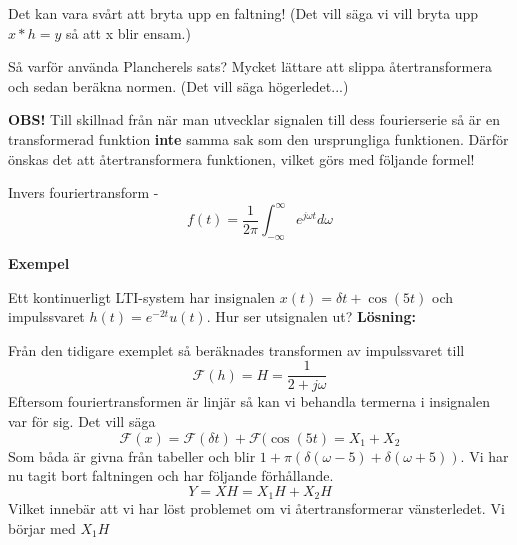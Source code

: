 \documentclass{article}
\begin{document}
Det kan vara svårt att bryta upp en faltning!
(Det vill säga vi vill bryta upp $x*h=y$ så att x blir ensam.)

Så varför använda Plancherels sats? Mycket lättare att slippa återtransformera
och sedan beräkna normen. (Det vill säga högerledet...)

\textbf{OBS!} Till skillnad från när man utvecklar signalen till dess
fourierserie så är en transformerad funktion \textbf{inte} samma sak
som den ursprungliga funktionen.
Därför önskas det att återtransformera funktionen, vilket görs med följande formel!

Invers fouriertransform -
\begin{displaymath}
  f(t) = \frac{1}{2 \pi} \int_{-\infty}^{\infty}  e^{j \omega t} d\omega
\end{displaymath}

\textbf{Exempel} %

Ett kontinuerligt LTI-system har insignalen $x(t)=\delta{t} + \cos(5 t)$
och impulssvaret $h(t) = e^{-2 t} u(t)$. Hur ser utsignalen ut?
\textbf{Lösning:}

Från den tidigare exemplet så beräknades transformen av impulssvaret till
\begin{displaymath}
  \mathcal{F}(h) = H = \frac{1}{2+j \omega}
\end{displaymath}
Eftersom fouriertransformen är linjär så kan vi behandla termerna i
insignalen var för sig. Det vill säga
\begin{displaymath}
  \mathcal{F} (x) = \mathcal{F}(\delta{t}) + \mathcal{F}(\cos(5 t) = X_1 + X_2
\end{displaymath}
Som båda är givna från tabeller och blir
$1+\pi(\delta(\omega - 5) + \delta(\omega + 5))$.
Vi har nu tagit bort faltningen och har följande förhållande.
\begin{displaymath}
  Y = X H = X_1 H + X_2 H
\end{displaymath}
Vilket innebär att vi har löst problemet om vi återtransformerar vänsterledet.
Vi börjar med $X_1 H$
\end{document}
